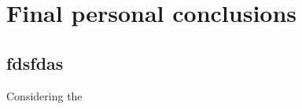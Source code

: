 
\chapter{Final personal conclusions} %

\label{Chapter5} %



\section{fdsfdas}

Considering the 

